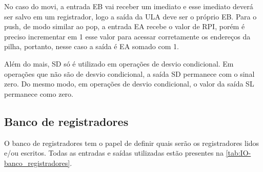 \documentclass[
	12pt,				%
	oneside,
	a4paper,			%
	english,			%
	french,				%
	spanish,			%
	brazil,				%
	]{abntex2}
\begin{document}
No caso do movi, a entrada EB vai receber um imediato e esse imediato deverá ser salvo em um registrador, logo a saída da ULA deve ser o próprio EB. Para o push, de modo similar ao pop, a entrada EA recebe o valor de RPI, porém é preciso incrementar em 1 esse valor para acessar corretamente os endereços da pilha, portanto, nesse caso a saída é EA somado com 1.

Além do mais, SD só é utilizado em operações de desvio condicional. Em operações que não são de desvio condicional, a saída SD permanece com o sinal zero. Do mesmo modo, em operações de desvio condicional, o valor da saída SL permanece como zero.

\subsection{Banco de registradores}

O banco de registradores tem o papel de definir quais serão os registradores lidos e/ou escritos. Todas as entradas e saídas utilizadas estão presentes na \autoref{tab:IO-banco_registradores}.
\end{document}
